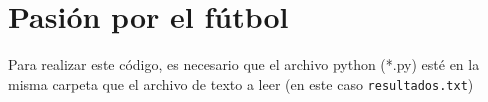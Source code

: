 \section{Pasión por el fútbol}

Para realizar este código, es necesario que el archivo python (*.py) esté en la misma carpeta que el archivo de texto a leer (en este caso \texttt{resultados.txt})

    